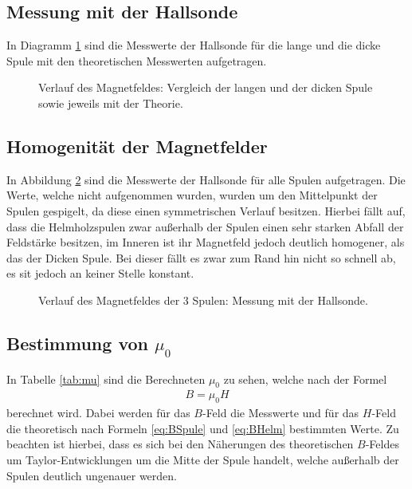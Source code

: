 \documentclass[12pt,a4paper,titlepage,headinclude,bibtotoc]{scrartcl}
\begin{document}
\subsection{Messung mit der Hallsonde}
In Diagramm \ref{fig:HallVergleich} sind die Messwerte der Hallsonde für die lange und die dicke Spule mit den theoretischen Messwerten aufgetragen.

\begin{figure}[!htb]
	\centering
	
	\caption{Verlauf des Magnetfeldes: Vergleich der langen und der dicken Spule sowie jeweils mit der Theorie.}
	\label{fig:HallVergleich}
\end{figure}
\subsection{Homogenität der Magnetfelder}
In Abbildung \ref{fig:Homogen} sind die Messwerte der Hallsonde für alle Spulen aufgetragen.
Die Werte, welche nicht aufgenommen wurden, wurden um den Mittelpunkt der Spulen gespigelt, da diese einen symmetrischen Verlauf besitzen.
Hierbei fällt auf, dass die Helmholzspulen zwar außerhalb der Spulen einen sehr starken Abfall der Feldstärke besitzen, im Inneren ist ihr Magnetfeld jedoch deutlich homogener, als das der Dicken Spule.
Bei dieser fällt es zwar zum Rand hin nicht so schnell ab, es sit jedoch an keiner Stelle konstant.

\begin{figure}[!htb]
	\centering
	
	\caption{Verlauf des Magnetfeldes der 3 Spulen: Messung mit der Hallsonde.}
	\label{fig:Homogen}
\end{figure}

\subsection{Bestimmung von $\mu_0$}
In Tabelle \ref{tab:mu} sind die Berechneten $\mu_0$ zu sehen, welche nach der Formel
\begin{align*}
	B=\mu_0 H
\end{align*}
berechnet wird.
Dabei werden für das $B$-Feld die Messwerte und für das $H$-Feld die theoretisch nach Formeln \eqref{eq:BSpule} und \eqref{eq:BHelm} bestimmten Werte.
Zu beachten ist hierbei, dass es sich bei den Näherungen des theoretischen $B$-Feldes um Taylor-Entwicklungen um die Mitte der Spule handelt, welche außerhalb der Spulen deutlich ungenauer werden.
\end{document}
